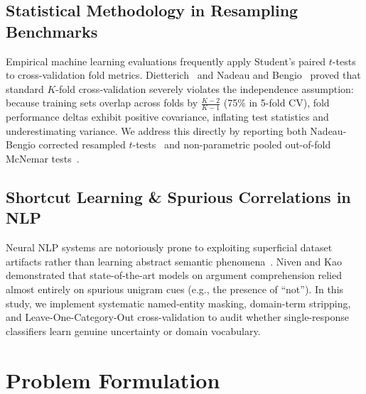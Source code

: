 \documentclass[conference]{IEEEtran}
\begin{document}
\subsection{Statistical Methodology in Resampling Benchmarks}
Empirical machine learning evaluations frequently apply Student's paired $t$-tests to cross-validation fold metrics. Dietterich~\cite{dietterich1998approximate} and Nadeau and Bengio~\cite{nadeau2003inference} proved that standard $K$-fold cross-validation severely violates the independence assumption: because training sets overlap across folds by $\frac{K-2}{K-1}$ (75\% in 5-fold CV), fold performance deltas exhibit positive covariance, inflating test statistics and underestimating variance. We address this directly by reporting both Nadeau-Bengio corrected resampled $t$-tests~\cite{nadeau2003inference} and non-parametric pooled out-of-fold McNemar tests~\cite{mcnemar1947note}.

\subsection{Shortcut Learning \& Spurious Correlations in NLP}
Neural NLP systems are notoriously prone to exploiting superficial dataset artifacts rather than learning abstract semantic phenomena~\cite{geirhos2020shortcut}. Niven and Kao~\cite{niven2019probing} demonstrated that state-of-the-art models on argument comprehension relied almost entirely on spurious unigram cues (e.g., the presence of ``not''). In this study, we implement systematic named-entity masking, domain-term stripping, and Leave-One-Category-Out cross-validation to audit whether single-response classifiers learn genuine uncertainty or domain vocabulary.

\section{Problem Formulation}
\end{document}
